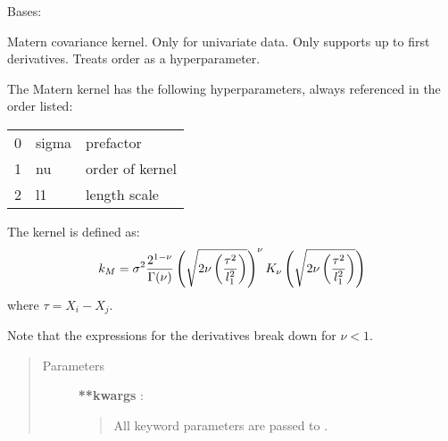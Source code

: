 \documentclass[letterpaper,10pt,english]{sphinxmanual}
\begin{document}

\begin{fulllineitems}
\label{gptools.kernel:gptools.kernel.matern.MaternKernel1d}
Bases: {\hyperref[gptools.kernel:gptools.kernel.core.Kernel]{}}

Matern covariance kernel. Only for univariate data. Only supports up to first derivatives. Treats order as a hyperparameter.

The Matern kernel has the following hyperparameters, always referenced in
the order listed:

\begin{tabulary}{\linewidth}{|L|L|L|}
\hline

0
 & 
sigma
 & 
prefactor
\\

1
 & 
nu
 & 
order of kernel
\\

2
 & 
l1
 & 
length scale
\\
\hline\end{tabulary}


The kernel is defined as:
\begin{gather}
\begin{split}k_M = \sigma^2 \frac{2^{1-\nu}}{\Gamma(\nu)}
\left (\sqrt{2\nu \left (\frac{\tau^2}{l_1^2}\right )}\right )^\nu
K_\nu\left(\sqrt{2\nu \left(\frac{\tau^2}{l_1^2}\right)}\right)\end{split}\notag
\end{gather}
where \(\tau=X_i-X_j\).

Note that the expressions for the derivatives break down for \(\nu < 1\).
\begin{quote}\begin{description}
\item[{Parameters}] \leavevmode
\textbf{**kwargs} :
\begin{quote}

All keyword parameters are passed to {\hyperref[gptools.kernel:gptools.kernel.core.Kernel]{}}.
\end{quote}

\end{description}\end{quote}


\end{fulllineitems}
\end{document}
